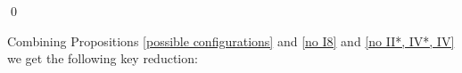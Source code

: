 \documentclass[oneside, 12pt]{amsart}
\theoremstyle{definition}
\theoremstyle{remark}
\newcommand{\I}{\text{\rm I}}
\newcommand{\III}{\text{\rm III}}
\newcommand{\ind}{\text{\rm ind}}
\newcommand{\inv}{{-1}}
\begin{document}
% 
% 
% 
% 
% 
% 
% 
\qed

\medskip
Combining  Propositions  \ref{possible configurations} and \ref{no I8} and  \ref{no II*, IV*, IV}  we get the following key reduction:
\end{document}
